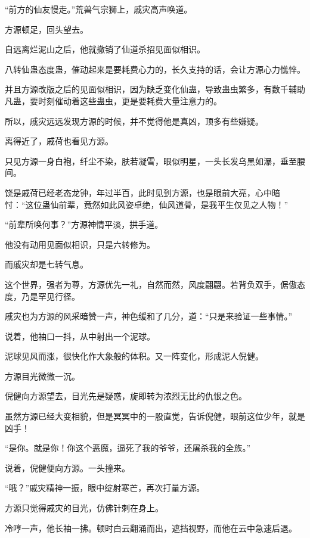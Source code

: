 
\begin{this_body}



“前方的仙友慢走。”荒兽气宗狮上，戚灾高声唤道。

方源顿足，回头望去。

自远离烂泥山之后，他就撤销了仙道杀招见面似相识。

八转仙蛊态度蛊，催动起来是要耗费心力的，长久支持的话，会让方源心力憔悴。

并且方源改版之后的见面似相识，因为缺乏变化仙蛊，导致蛊虫繁多，有数千辅助凡蛊，要时刻催动着这些蛊虫，更是要耗费大量注意力的。

所以，戚灾远远发现方源的时候，并不觉得他是真凶，顶多有些嫌疑。

离得近了，戚荷也看见方源。

只见方源一身白袍，纤尘不染，肤若凝雪，眼似明星，一头长发乌黑如瀑，垂至腰间。

饶是戚荷已经老态龙钟，年过半百，此时见到方源，也是眼前大亮，心中暗忖：“这位蛊仙前辈，竟然如此风姿卓绝，仙风道骨，是我平生仅见之人物！”

“前辈所唤何事？”方源神情平淡，拱手道。

他没有动用见面似相识，只是六转修为。

而戚灾却是七转气息。

这个世界，强者为尊，方源优先一礼，自然而然，风度翩翩。若背负双手，倨傲态度，乃是罕见行径。

戚灾也为方源的风采暗赞一声，神色缓和了几分，道：“只是来验证一些事情。”

说着，他袖口一抖，从中射出一个泥球。

泥球见风而涨，很快化作大象般的体积。又一阵变化，形成泥人倪健。

方源目光微微一沉。

倪健向方源望去，目光先是疑惑，旋即转为浓烈无比的仇恨之色。

虽然方源已经大变相貌，但是冥冥中的一股直觉，告诉倪健，眼前这位少年，就是凶手！

“是你。就是你！你这个恶魔，逼死了我的爷爷，还屠杀我的全族。”

说着，倪健便向方源。一头撞来。

“哦？”戚灾精神一振，眼中绽射寒芒，再次打量方源。

方源只觉得戚灾的目光，仿佛针刺在身上。

冷哼一声，他长袖一拂。顿时白云翻涌而出，遮挡视野，而他在云中急速后退。


\end{this_body}
